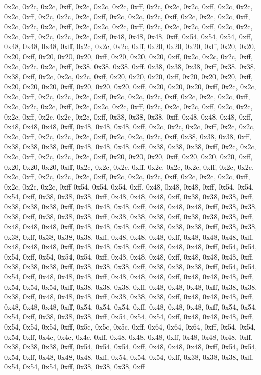 0x2c, 0x2c, 0x2c, 0xff, 0x2c, 0x2c, 0x2c, 0xff, 0x2c, 0x2c, 0x2c, 0xff, 0x2c, 0x2c, 0x2c, 0xff, 0x2c, 0x2c, 0x2c, 0xff, 0x2c, 0x2c, 0x2c, 0xff, 0x2c, 0x2c, 0x2c, 0xff, 0x2c, 0x2c, 0x2c, 0xff, 0x2c, 0x2c, 0x2c, 0xff, 0x2c, 0x2c, 0x2c, 0xff, 0x2c, 0x2c, 0x2c, 0xff, 0x2c, 0x2c, 0x2c, 0xff, 0x48, 0x48, 0x48, 0xff, 0x54, 0x54, 0x54, 0xff, 0x48, 0x48, 0x48, 0xff, 0x2c, 0x2c, 0x2c, 0xff, 0x20, 0x20, 0x20, 0xff, 0x20, 0x20, 0x20, 0xff, 0x20, 0x20, 0x20, 0xff, 0x20, 0x20, 0x20, 0xff, 0x2c, 0x2c, 0x2c, 0xff, 0x2c, 0x2c, 0x2c, 0xff, 0x38, 0x38, 0x38, 0xff, 0x38, 0x38, 0x38, 0xff, 0x38, 0x38, 0x38, 0xff, 0x2c, 0x2c, 0x2c, 0xff, 0x20, 0x20, 0x20, 0xff, 0x20, 0x20, 0x20, 0xff, 0x20, 0x20, 0x20, 0xff, 0x20, 0x20, 0x20, 0xff, 0x20, 0x20, 0x20, 0xff, 0x2c, 0x2c, 0x2c, 0xff, 0x2c, 0x2c, 0x2c, 0xff, 0x2c, 0x2c, 0x2c, 0xff, 0x2c, 0x2c, 0x2c, 0xff, 0x2c, 0x2c, 0x2c, 0xff, 0x2c, 0x2c, 0x2c, 0xff, 0x2c, 0x2c, 0x2c, 0xff, 0x2c, 0x2c, 0x2c, 0xff, 0x2c, 0x2c, 0x2c, 0xff, 0x38, 0x38, 0x38, 0xff, 0x48, 0x48, 0x48, 0xff, 0x48, 0x48, 0x48, 0xff, 0x48, 0x48, 0x48, 0xff, 0x2c, 0x2c, 0x2c, 0xff, 0x2c, 0x2c, 0x2c, 0xff, 0x2c, 0x2c, 0x2c, 0xff, 0x2c, 0x2c, 0x2c, 0xff, 0x38, 0x38, 0x38, 0xff, 0x38, 0x38, 0x38, 0xff, 0x48, 0x48, 0x48, 0xff, 0x38, 0x38, 0x38, 0xff, 0x2c, 0x2c, 0x2c, 0xff, 0x2c, 0x2c, 0x2c, 0xff, 0x20, 0x20, 0x20, 0xff, 0x20, 0x20, 0x20, 0xff, 0x20, 0x20, 0x20, 0xff, 0x2c, 0x2c, 0x2c, 0xff, 0x2c, 0x2c, 0x2c, 0xff, 0x2c, 0x2c, 0x2c, 0xff, 0x2c, 0x2c, 0x2c, 0xff, 0x2c, 0x2c, 0x2c, 0xff, 0x2c, 0x2c, 0x2c, 0xff, 0x2c, 0x2c, 0x2c, 0xff
0x54, 0x54, 0x54, 0xff, 0x48, 0x48, 0x48, 0xff, 0x54, 0x54, 0x54, 0xff, 0x38, 0x38, 0x38, 0xff, 0x48, 0x48, 0x48, 0xff, 0x38, 0x38, 0x38, 0xff, 0x38, 0x38, 0x38, 0xff, 0x48, 0x48, 0x48, 0xff, 0x48, 0x48, 0x48, 0xff, 0x38, 0x38, 0x38, 0xff, 0x38, 0x38, 0x38, 0xff, 0x38, 0x38, 0x38, 0xff, 0x38, 0x38, 0x38, 0xff, 0x48, 0x48, 0x48, 0xff, 0x48, 0x48, 0x48, 0xff, 0x38, 0x38, 0x38, 0xff, 0x38, 0x38, 0x38, 0xff, 0x38, 0x38, 0x38, 0xff, 0x48, 0x48, 0x48, 0xff, 0x48, 0x48, 0x48, 0xff, 0x48, 0x48, 0x48, 0xff, 0x48, 0x48, 0x48, 0xff, 0x48, 0x48, 0x48, 0xff, 0x54, 0x54, 0x54, 0xff, 0x54, 0x54, 0x54, 0xff, 0x48, 0x48, 0x48, 0xff, 0x48, 0x48, 0x48, 0xff, 0x38, 0x38, 0x38, 0xff, 0x38, 0x38, 0x38, 0xff, 0x38, 0x38, 0x38, 0xff, 0x54, 0x54, 0x54, 0xff, 0x48, 0x48, 0x48, 0xff, 0x48, 0x48, 0x48, 0xff, 0x48, 0x48, 0x48, 0xff, 0x54, 0x54, 0x54, 0xff, 0x38, 0x38, 0x38, 0xff, 0x48, 0x48, 0x48, 0xff, 0x38, 0x38, 0x38, 0xff, 0x48, 0x48, 0x48, 0xff, 0x38, 0x38, 0x38, 0xff, 0x48, 0x48, 0x48, 0xff, 0x48, 0x48, 0x48, 0xff, 0x54, 0x54, 0x54, 0xff, 0x48, 0x48, 0x48, 0xff, 0x54, 0x54, 0x54, 0xff, 0x38, 0x38, 0x38, 0xff, 0x54, 0x54, 0x54, 0xff, 0x48, 0x48, 0x48, 0xff, 0x54, 0x54, 0x54, 0xff, 0x5c, 0x5c, 0x5c, 0xff, 0x64, 0x64, 0x64, 0xff, 0x54, 0x54, 0x54, 0xff, 0x4c, 0x4c, 0x4c, 0xff, 0x48, 0x48, 0x48, 0xff, 0x48, 0x48, 0x48, 0xff, 0x38, 0x38, 0x38, 0xff, 0x54, 0x54, 0x54, 0xff, 0x48, 0x48, 0x48, 0xff, 0x54, 0x54, 0x54, 0xff, 0x48, 0x48, 0x48, 0xff, 0x54, 0x54, 0x54, 0xff, 0x38, 0x38, 0x38, 0xff, 0x54, 0x54, 0x54, 0xff, 0x38, 0x38, 0x38, 0xff
